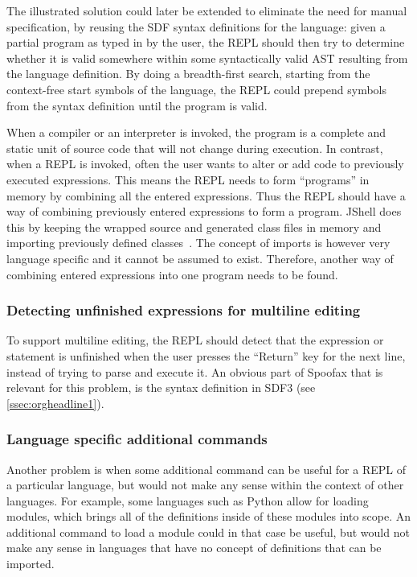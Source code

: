 The illustrated solution could later be extended to eliminate the need for
manual specification, by reusing the SDF syntax definitions for the language:
given a partial program as typed in by the user, the REPL should then try to
determine whether it is valid somewhere within some syntactically valid AST
resulting from the language definition. By doing a breadth-first search,
starting from the context-free start symbols of the language, the REPL could
prepend symbols from the syntax definition until the program is valid.

When a compiler or an interpreter is invoked, the program is a complete and
static unit of source code that will not change during execution. In contrast,
when a REPL is invoked, often the user wants to alter or add code to previously
executed expressions. This means the REPL needs to form ``programs'' in memory
by combining all the entered expressions.  Thus the REPL should have a way of
combining previously entered expressions to form a program. JShell does this by
keeping the wrapped source and generated class files in memory and importing
previously defined classes~\cite{jshell-repl}. The concept of imports is
however very language specific and it cannot be assumed to exist.  Therefore,
another way of combining entered expressions into one program needs to be
found.

\subsubsection{Detecting unfinished expressions for multiline editing}
\label{sec:detect-unfin-expr}
To support multiline editing, the REPL should detect that the
expression or statement is unfinished when the user presses the
``Return'' key for the next line, instead of trying to parse and
execute it. An obvious part of Spoofax that is relevant for this
problem, is the syntax definition in SDF3 (see
\cref{ssec:orgheadline1}).

\subsubsection{Language specific additional commands}
\label{sec:lang-spec-addit}
Another problem is when some additional command can be useful for a
REPL of a particular language, but would not make any sense within the
context of other languages. For example, some languages such as Python
allow for loading modules, which brings all of the definitions inside
of these modules into scope. An additional command to load a module could in that
case be useful, but would not make any sense in languages that have no
concept of definitions that can be imported.

